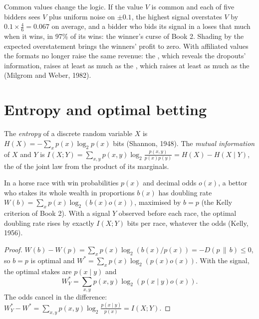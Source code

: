 Common values change the logic. If the value $V$ is common and each of five bidders sees $V$ plus uniform noise on $\pm0.1$, the highest signal overstates $V$ by $0.1 \times \frac46 = 0.067$ on average, and a bidder
who bids its signal in a  loses that much when it wins, in 97\% of its wins: the winner's curse of Book 2. Shading by the expected overstatement brings the winners' profit to zero. With
affiliated values the formats no longer raise the same revenue: the , which reveals the dropouts' information, raises at least as much as the , which raises at least as much as the
 (Milgrom and Weber, 1982).

\section{Entropy and optimal betting}

\begin{definition}\label{def:qm:games-auctions-and-information:entropy}
The \emph{entropy} of a discrete random variable $X$ is $H(X) = -\sum_xp(x)\log_2p(x)$ bits (Shannon, 1948). The \emph{mutual information} of $X$ and $Y$ is $I(X; Y) =
\sum_{x,y}p(x, y)\log_2\frac{p(x, y)}{p(x)p(y)} = H(X) - H(X \mid Y)$, the  of the joint law from the product of its marginals.
\end{definition}

\begin{theorem}\label{thm:qm:games-auctions-and-information:kelly}
In a horse race with win probabilities $p(x)$ and decimal odds $o(x)$, a bettor who stakes its whole wealth in proportions $b(x)$ has doubling rate $W(b) = \sum_xp(x)\log_2(b(x)o(x))$, maximised by $b = p$ (the
Kelly criterion of Book 2). With a signal $Y$ observed before each race, the optimal doubling rate rises by exactly $I(X; Y)$ bits per race, whatever the odds (Kelly, 1956).
\end{theorem}

\begin{proof}
$W(b) - W(p) = \sum_xp(x)\log_2(b(x)/p(x)) = -D(p\,\|\,b) \le 0$, so $b = p$ is optimal and $W^* = \sum_xp(x)\log_2(p(x)o(x))$. With the signal, the optimal stakes are $p(x \mid y)$ and
\[W^*_Y = \sum_{x,y}p(x, y)\log_2(p(x \mid y)o(x)).\] The odds cancel in the difference: $W^*_Y - W^* = \sum_{x,y}p(x, y)\log_2\frac{p(x \mid y)}{p(x)} = I(X; Y)$.
\end{proof}

